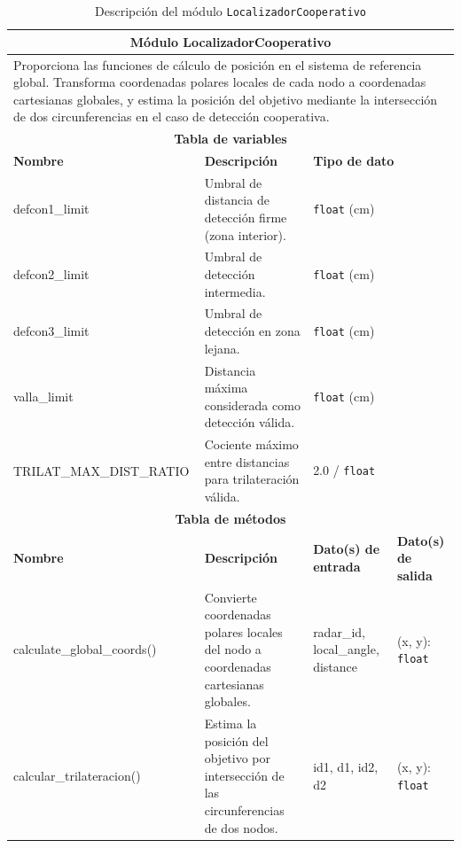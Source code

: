 \begin{table}[h!]
\centering
\small
\renewcommand{\arraystretch}{1.25}
\begin{tabular}{|p{2.8cm}|p{5.5cm}|p{2.8cm}|p{1.7cm}|}
\hline
\multicolumn{4}{|c|}{\textbf{Módulo LocalizadorCooperativo}} \\
\hline
\multicolumn{4}{|p{12.8cm}|}{Proporciona las funciones de cálculo de posición en el
sistema de referencia global. Transforma coordenadas polares locales de cada nodo
a coordenadas cartesianas globales, y estima la posición del objetivo mediante la
intersección de dos circunferencias en el caso de detección cooperativa.} \\
\hline
\multicolumn{4}{|c|}{\textbf{Tabla de variables}} \\
\hline
\textbf{Nombre} & \textbf{Descripción} & \multicolumn{2}{l|}{\textbf{Tipo de dato}} \\
\hline
defcon1\_limit & Umbral de distancia de detección firme (zona interior). & \multicolumn{2}{l|}{\texttt{float} (cm)} \\
\hline
defcon2\_limit & Umbral de detección intermedia. & \multicolumn{2}{l|}{\texttt{float} (cm)} \\
\hline
defcon3\_limit & Umbral de detección en zona lejana. & \multicolumn{2}{l|}{\texttt{float} (cm)} \\
\hline
valla\_limit & Distancia máxima considerada como detección válida. & \multicolumn{2}{l|}{\texttt{float} (cm)} \\
\hline
TRILAT\_MAX\_DIST\_RATIO & Cociente máximo entre distancias para trilateración válida. & \multicolumn{2}{l|}{2.0 / \texttt{float}} \\
\hline
\multicolumn{4}{|c|}{\textbf{Tabla de métodos}} \\
\hline
\textbf{Nombre} & \textbf{Descripción} & \textbf{Dato(s) de entrada} & \textbf{Dato(s) de salida} \\
\hline
calculate\_global\_coords() & Convierte coordenadas polares locales del nodo a coordenadas cartesianas globales. & radar\_id, local\_angle, distance & (x, y): \texttt{float} \\
\hline
calcular\_trilateracion() & Estima la posición del objetivo por intersección de las circunferencias de dos nodos. & id1, d1, id2, d2 & (x, y): \texttt{float} \\
\hline
\end{tabular}
\caption{Descripción del módulo \texttt{LocalizadorCooperativo}}
\label{tab:module_localizador}
\end{table}

